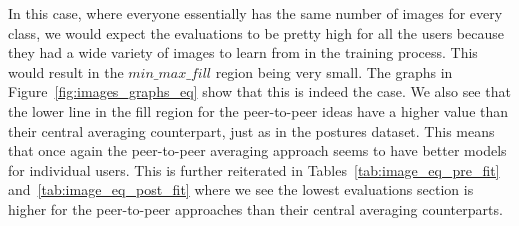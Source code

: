 \documentclass[12pt]{article}
\begin{document}
\noindent In this case, where everyone essentially has the same number of images for every class, we would expect the evaluations to be pretty high for all the users because they had a wide variety of images to learn from in the training process. This would result in the $min\_max\_fill$ region being very small. The graphs in Figure~\ref{fig:images_graphs_eq} show that this is indeed the case. We also see that the lower line in the fill region for the peer-to-peer ideas have a higher value than their central averaging counterpart, just as in the postures dataset. This means that once again the peer-to-peer averaging approach seems to have better models for individual users. This is further reiterated in Tables~\ref{tab:image_eq_pre_fit} and~\ref{tab:image_eq_post_fit} where we see the lowest evaluations section is higher for the peer-to-peer approaches than their central averaging counterparts. 
\begin{table}[H] %
\def\arraystretch{1.2}%
\caption{Images dataset: Pre fit results at the end of the rounds from testing user models with $P = \tfrac{1}{8}$.} \label{tab:image_eq_pre_fit}
\end{table}
\end{document}
